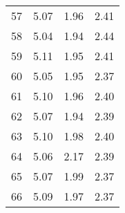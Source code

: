 \documentclass[a4paper]{article}
\begin{document}
\begin{minipage}{\textwidth}
\begin{tabular}{ c c c c }
                       57 &       5.07 &   1.96 &      2.41 \\
                       58 &       5.04 &   1.94 &      2.44 \\
                       59 &       5.11 &   1.95 &      2.41 \\
                       60 &       5.05 &   1.95 &      2.37 \\
                       61 &       5.10 &   1.96 &      2.40 \\
                       62 &       5.07 &   1.94 &      2.39 \\
                       63 &       5.10 &   1.98 &      2.40 \\
                       64 &       5.06 &   2.17 &      2.39 \\
                       65 &       5.07 &   1.99 &      2.37 \\
                       66 &       5.09 &   1.97 &      2.37 \\
            \end{tabular}
        \end{minipage}
\end{document}
